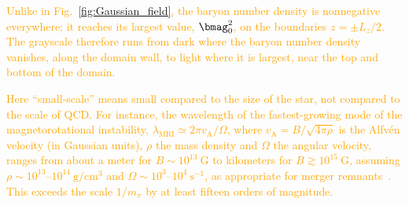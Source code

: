 %



\textcolor{orange}{Unlike in Fig.~\ref{fig:Gaussian_field}, the baryon number density is nonnegative everywhere; it reaches its largest value, $\bmag_0^2$, on the boundaries $z=\pm L_z/2$. The grayscale therefore runs from dark where the baryon number density vanishes, along the domain wall, to light where it is largest, near the top and bottom of the domain.}



\textcolor{orange}{Here ``small-scale'' means small compared to the size of the star, not compared to the scale of QCD. For instance, the wavelength of the fastest-growing mode of the magnetorotational instability, $\lambda_\text{MRI}\simeq2\pi v_\text{A}/\Omega$, where $v_\text{A}=B/\sqrt{4\pi\rho}$ is the Alfv\'en velocity (in Gaussian units), $\rho$ the mass density and $\Omega$ the angular velocity, ranges from about a meter for $B\sim10^{13}~\mathrm{G}$ to kilometers for $B\gtrsim10^{15}~\mathrm{G}$, assuming $\rho\sim10^{13}$--$10^{14}~\mathrm{g}/\mathrm{cm}^3$ and $\Omega\sim10^3$--$10^4~\mathrm{s}^{-1}$, as appropriate for merger remnants~\cite{Siegel2013MRI,Guilet2017MRI}. This exceeds the scale $1/m_\pi$ by at least fifteen orders of magnitude.}


